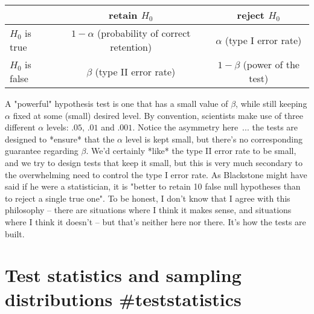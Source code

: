 \begin{center}
\begin{tabular}{l|cc}
 & retain $H_0$ & reject $H_0$ \\ \hline
 $H_0$ is true & $1-\alpha$ (probability of correct retention) & $\alpha$ (type I error rate) \\
 $H_0$ is false & $\beta$ (type II error rate) & $1-\beta$  (power of the test)\\
\end{tabular} 
\end{center}


A "powerful" hypothesis test is one that has a small value of $\beta$, while still keeping $\alpha$ fixed at some (small) desired level. By convention, scientists make use of three different $\alpha$ levels: $.05$, $.01$ and $.001$. Notice the asymmetry here~... the tests are designed to *ensure* that the $\alpha$ level is kept small, but there's no corresponding guarantee regarding $\beta$. We'd certainly *like* the type II error rate to be small, and we try to design tests that keep it small, but this is very much secondary to the overwhelming need to control the type I error rate. As Blackstone might have said if he were a statistician, it is "better to retain 10 false null hypotheses than to reject a single true one". To be honest, I don't know that I agree with this philosophy -- there are situations where I think it makes sense, and situations where I think it doesn't -- but that's neither here nor there. It's how the tests are built.


\section{Test statistics and sampling distributions {#teststatistics}} 

